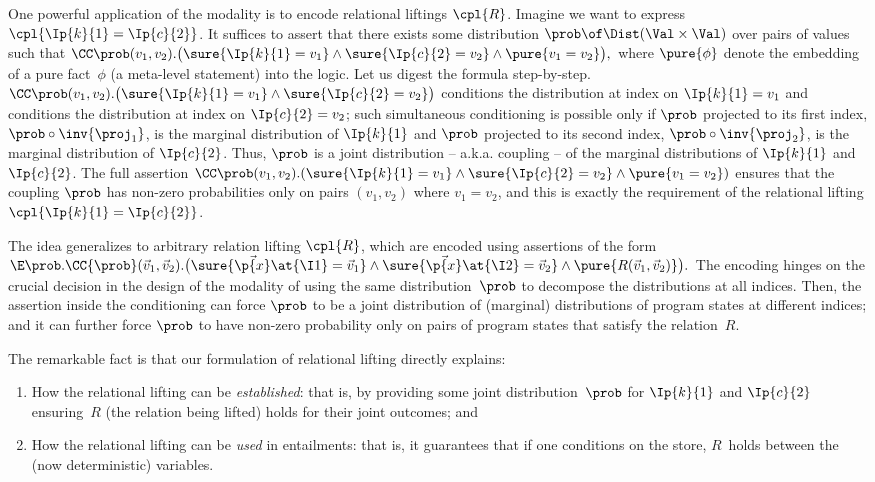 One powerful application of the \supercond modality is to encode relational
liftings $\cpl{R}$.
Imagine we want to express $\cpl{ \Ip{k}{1} = \Ip{c}{2} }$.
It suffices to assert that there exists some distribution
$\prob \of \Dist(\Val\times\Val)$ over pairs of values such that
$
  \CC\prob (v_1,v_2).\bigl(
    \sure{\Ip{k}{1} = v_1} \land
    \sure{\Ip{c}{2} = v_2} \land
    \pure{v_1=v_2}
  \bigr),
$
where $\pure{\phi}$ denote the embedding of a pure fact~$\phi$ (\ie a meta-level statement) into the logic. Let us digest the formula step-by-step.
$\CC\prob (v_1,v_2). \bigl(\sure{\Ip{k}{1} = v_1} \land \sure{\Ip{c}{2} = v_2}\bigr)$
conditions the distribution at index  on $\Ip{k}{1} = v_1$ and
conditions the distribution at index  on $\Ip{c}{2} = v_2$;
such simultaneous conditioning is possible only if $\prob$ projected
to its first index, $\prob \circ \inv{\proj_1}$, is the marginal distribution
of $\Ip{k}{1}$ and $\prob$ projected to its second index, $\prob \circ
\inv{\proj_2}$, is the marginal distribution of $\Ip{c}{2}$.
Thus, $\prob$ is a joint distribution -- a.k.a. coupling -- of the marginal distributions of $\Ip{k}{1}$ and $\Ip{c}{2}$.
The full assertion $\CC\prob (v_1,v_2).(
    \sure{\Ip{k}{1} = v_1} \land
    \sure{\Ip{c}{2} = v_2} \land
    \pure{v_1=v_2})$
ensures that the coupling $\prob$ has non-zero probabilities only on pairs
$(v_1, v_2)$ where $v_1 = v_2$, and this is exactly the requirement of the relational lifting $\cpl{\Ip{k}{1} = \Ip{c}{2}}$.


The idea generalizes to arbitrary relation lifting $\cpl{R}$,
which are encoded using assertions of the form
$
  \E\prob.\CC{\prob} (\vec{v}_1,\vec{v}_2).\bigl(
    \sure{\vec{\p{x}}\at{\I1}=\vec{v}_1}
    \land
    \sure{\vec{\p{x}}\at{\I2}=\vec{v}_2}
    \land
    \pure{R(\vec{v}_1,\vec{v}_2)}
  \bigr).
$
The encoding hinges on the crucial decision in the design of the
\supercond modality of using the same distribution~$\prob$ to
decompose the distributions at all indices.
Then, the assertion inside the conditioning can force $\prob$ to be
a joint distribution of (marginal) distributions of program states at
different indices; and it can further force $\prob$ to have non-zero
probability only on pairs of program states that satisfy the relation~$R$.


\begin{result}
The remarkable fact is that our formulation of
relational lifting directly explains:
\begin{enumerate}
\item How the relational lifting can be \emph{established}:
  that is, by providing some joint distribution~$\prob$ for
  $\Ip{k}{1}$ and $\Ip{c}{2}$ ensuring~$R$ (the relation being lifted)
  holds for their joint outcomes;
  and
\item
  How the relational lifting can be \emph{used} in entailments:
  that is, it guarantees that if one conditions on the store,
  $R$~holds between the (now deterministic) variables.
\end{enumerate}
\end{result}

